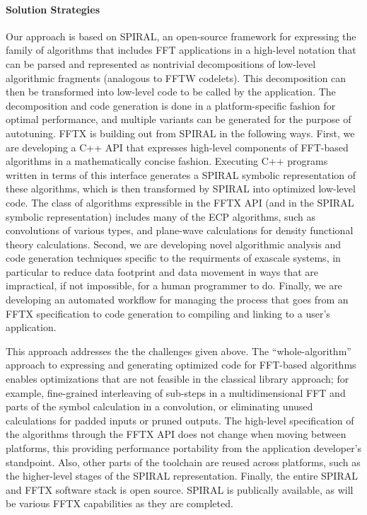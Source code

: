 \paragraph{Solution Strategies}
Our approach is based on SPIRAL, an open-source framework for expressing the family of algorithms that includes FFT applications in a high-level notation that can be parsed and represented as nontrivial decompositions of low-level algorithmic fragments (analogous to FFTW codelets). This decomposition can then be transformed into low-level code to be called by the application. The decomposition and code generation is done in a platform-specific fashion for optimal performance, and multiple variants can be generated for the purpose of autotuning.
FFTX is building out from SPIRAL in the following ways.
First, we are developing a C++ API that expresses high-level components of FFT-based algorithms in a mathematically concise fashion. Executing C++ programs written in terms of this interface generates a SPIRAL symbolic representation of these algorithms, which is then transformed by SPIRAL into optimized low-level code. The class of algorithms expressible in the FFTX API (and in the SPIRAL symbolic representation) includes many of the ECP algorithms, such as convolutions of various types, and plane-wave calculations for density functional theory calculations. Second, we are developing novel algorithmic analysis and code generation techniques specific to the requirments of exascale systems, in particular to reduce data footprint and data movement in ways that are impractical, if not impossible, for a human programmer to do. Finally, we are developing an automated workflow for managing the process that goes from an FFTX specification to code generation to compiling and linking to a user's application. 

This approach addresses the the challenges given above. The ``whole-algorithm'' approach to expressing and generating optimized code for FFT-based algorithms enables optimizations that are not feasible in the classical library approach; for example, fine-grained interleaving of sub-steps in a multidimensional FFT and parts of the symbol calculation in a convolution, or eliminating unused calculations for padded inputs or pruned outputs. The high-level specification of the algorithms through the FFTX API does not change when moving between platforms, this providing performance portability from the application developer's standpoint. Also, other parts of the toolchain are reused across platforms, such as the higher-level stages of the SPIRAL representation. Finally, the entire SPIRAL and FFTX software stack is open source. SPIRAL is publically available, as will be various FFTX capabilities as they are completed.




